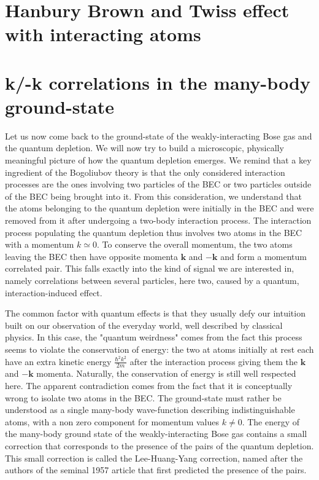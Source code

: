 \section{Hanbury Brown and Twiss effect with interacting atoms}


\section{k/-k correlations in the many-body ground-state}

Let us now come back to the ground-state of the weakly-interacting Bose gas and the quantum depletion. We will now try to build a microscopic, physically meaningful picture of how the quantum depletion emerges. We remind that a key ingredient of the Bogoliubov theory is that the only considered interaction processes are the ones involving two particles of the BEC or two particles outside of the BEC being brought into it. From this consideration, we understand that the atoms belonging to the quantum depletion were initially in the BEC and were removed from it after undergoing a two-body interaction process. The interaction process populating the quantum depletion thus involves two atoms in the BEC with a momentum $k \simeq 0$. To conserve the overall momentum, the two atoms leaving the BEC then have opposite momenta $\bm{k}$ and $-\bm{k}$ and form a momentum correlated pair. This falls exactly into the kind of signal we are interested in, namely correlations between several particles, here two, caused by a quantum, interaction-induced effect.

The common factor with quantum effects is that they usually defy our intuition built on our observation of the everyday world, well described by classical physics. In this case, the "quantum weirdness" comes from the fact this process seems to violate the conservation of energy: the two at atoms initially at rest each have an extra kinetic energy $\frac{\hbar^2 k^2}{2m}$ after the interaction process giving them the $\bm{k}$ and $-\bm{k}$ momenta. Naturally, the conservation of energy is still well respected here. The apparent contradiction comes from the fact that it is conceptually wrong to isolate two atoms in the BEC. The ground-state must rather be understood as a single many-body wave-function describing indistinguishable atoms, with a non zero component for momentum values $k \neq 0$. The energy of the many-body ground state of the weakly-interacting Bose gas contains a small correction that corresponds to the presence of the \kmk pairs of the quantum depletion. This small correction is called the Lee-Huang-Yang correction, named after the authors of the seminal 1957 article \cite{lee1957} that first predicted the presence of the \kmk pairs.

